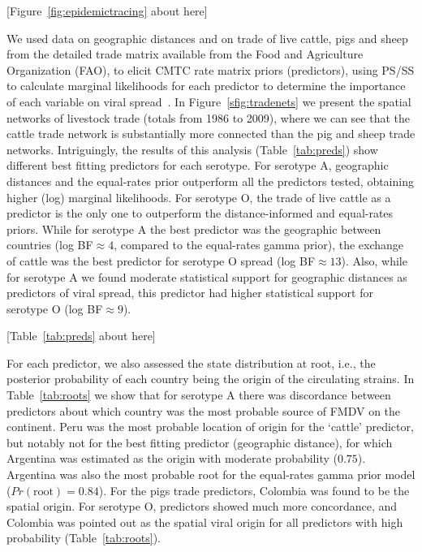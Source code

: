 \documentclass[10pt]{article}
\begin{document}
\begin{center}
 [Figure~\ref{fig:epidemictracing} about here]
\end{center}

We used data on geographic distances and on trade of live cattle, pigs and sheep from the detailed trade matrix available from the Food and Agriculture Organization (FAO), to elicit CMTC rate matrix priors (predictors), using PS/SS to calculate marginal likelihoods for each predictor to determine the importance of each variable on viral spread~\cite{Carvalho2013, Nelson2011}.
In Figure~\ref{sfig:tradenets} we present the spatial networks of livestock trade (totals from 1986 to 2009), where we can see that the cattle trade network is substantially more connected than the pig and sheep trade networks.
Intriguingly, the results of this analysis (Table~\ref{tab:preds}) show different best fitting predictors for each serotype.
For serotype A, geographic distances and the equal-rates prior outperform all the predictors tested, obtaining higher (log) marginal likelihoods.
For serotype O, the trade of live cattle as a predictor is the only one to outperform the distance-informed and equal-rates  priors.
While for serotype A the best predictor was the geographic between countries (log BF$\approx 4$, compared to the equal-rates gamma prior), the exchange of cattle was the best predictor for serotype O spread (log BF$\approx 13$).
Also, while for serotype A we found moderate statistical support for geographic distances as predictors of viral spread, this predictor had higher statistical support for serotype O (log BF$\approx 9$).

\begin{center}
 [Table~\ref{tab:preds} about here]
\end{center}

For each predictor, we also assessed the state distribution at root, i.e., the posterior probability of each country being the origin of the circulating strains.
In Table~\ref{tab:roots} we show that for serotype A there was discordance between predictors about which country was the most probable source of FMDV on the continent.
Peru was the most probable location of origin for the `cattle' predictor, but notably not for the best fitting predictor (geographic distance), for which Argentina was estimated as the origin with moderate probability ($0.75$).
Argentina was also the most probable root for the equal-rates gamma prior model ($Pr(\text{root})=0.84$).
For the pigs trade predictors, Colombia was found to be the spatial origin.
For serotype O, predictors showed much more concordance, and Colombia was pointed out as the spatial viral origin for all predictors with high probability (Table~\ref{tab:roots}).
\end{document}

